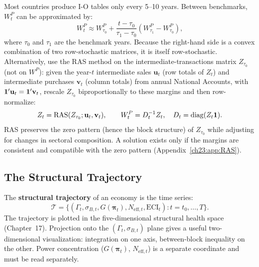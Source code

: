 \documentclass[../structural_economics_book.tex]{subfiles}
\begin{document}
\begin{definition}\label{ch23:prop:interpolation}
Most countries produce I-O tables only every 5--10 years. Between benchmarks, $W^P_t$ can be approximated by:
\begin{equation}\label{ch23:eq:interpolation}
W^P_t \approx W^P_{\tau_0} + \frac{t - \tau_0}{\tau_1 - \tau_0}(W^P_{\tau_1} - W^P_{\tau_0}),
\end{equation}
where $\tau_0$ and $\tau_1$ are the benchmark years. Because the right-hand side is a convex combination of two row-stochastic matrices, it is itself row-stochastic. Alternatively, use the RAS method on the intermediate-transactions matrix $Z_{\tau_0}$ (not on $W^P$): given the year-$t$ intermediate sales $\mathbf{u}_t$ (row totals of $Z_t$) and intermediate purchases $\mathbf{v}_t$ (column totals) from annual National Accounts, with $\mathbf{1}'\mathbf{u}_t = \mathbf{1}'\mathbf{v}_t$, rescale $Z_{\tau_0}$ biproportionally to these margins and then row-normalize:
\begin{equation}\label{ch23:eq:RAS}
Z_t = \text{RAS}(Z_{\tau_0}; \mathbf{u}_t, \mathbf{v}_t), \qquad W^P_t = D_t^{-1}Z_t, \quad D_t = \operatorname{diag}(Z_t\mathbf{1}).
\end{equation}
RAS preserves the zero pattern (hence the block structure) of $Z_{\tau_0}$ while adjusting for changes in sectoral composition. A solution exists only if the margins are consistent and compatible with the zero pattern (Appendix~\ref{ch23:app:RAS}).
\end{definition}


\subsection{The Structural Trajectory}

\begin{definition}\label{ch23:def:trajectory}
The \textbf{structural trajectory} of an economy is the time series:
\begin{equation}\label{ch23:eq:trajectory}
\mathcal{T} = \{(\Gamma_t, \sigma_{B,t}, G(\boldsymbol{\pi}_t), N_{\text{eff},t}, \text{ECI}_t) : t = t_0, \ldots, T\}.
\end{equation}
The trajectory is plotted in the five-dimensional structural health space (Chapter~17). Projection onto the $(\Gamma_t, \sigma_{B,t})$ plane gives a useful two-dimensional visualization: integration on one axis, between-block inequality on the other. Power concentration ($G(\boldsymbol{\pi}_t)$, $N_{\text{eff},t}$) is a separate coordinate and must be read separately.
\end{definition}
\end{document}
